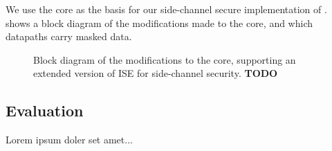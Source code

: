 We use the  core as the basis for our side-channel secure
implementation of .
 shows a block diagram of the modifications
made to the core, and which datapaths carry masked data.

\begin{figure}
\caption{Block diagram of the modifications to the  core,
supporting an extended version of ISE  for side-channel
security. {\bf TODO}}
\label{fig:sca:uarch}
\end{figure}


\subsection{Evaluation}

Lorem ipsum doler set amet...

